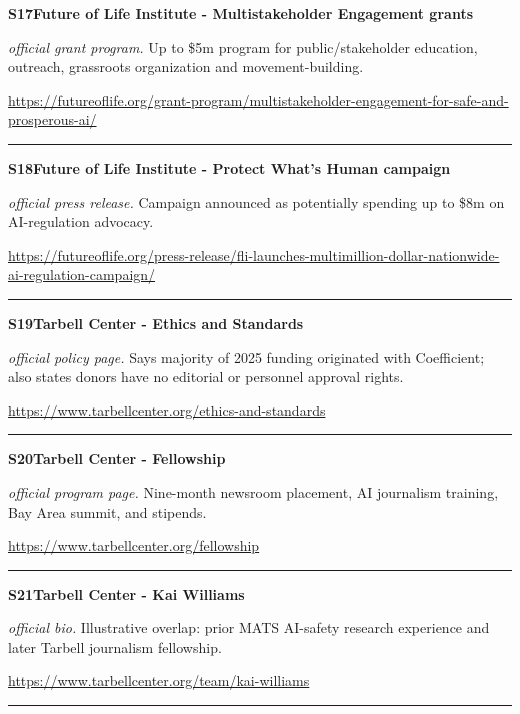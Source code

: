 \hypertarget{src:S17}{}\noindent\textbf{S17}\quad \textbf{Future of Life Institute - Multistakeholder Engagement grants}\hfill{}\par
\smallskip
\noindent\textit{official grant program.} Up to \$5m program for public/stakeholder education, outreach, grassroots organization and movement-building.\par
\noindent\url{https://futureoflife.org/grant-program/multistakeholder-engagement-for-safe-and-prosperous-ai/}\par
\medskip\hrule\medskip

\hypertarget{src:S18}{}\noindent\textbf{S18}\quad \textbf{Future of Life Institute - Protect What's Human campaign}\hfill{}\par
\smallskip
\noindent\textit{official press release.} Campaign announced as potentially spending up to \$8m on AI-regulation advocacy.\par
\noindent\url{https://futureoflife.org/press-release/fli-launches-multimillion-dollar-nationwide-ai-regulation-campaign/}\par
\medskip\hrule\medskip

\hypertarget{src:S19}{}\noindent\textbf{S19}\quad \textbf{Tarbell Center - Ethics and Standards}\hfill{}\par
\smallskip
\noindent\textit{official policy page.} Says majority of 2025 funding originated with Coefficient; also states donors have no editorial or personnel approval rights.\par
\noindent\url{https://www.tarbellcenter.org/ethics-and-standards}\par
\medskip\hrule\medskip

\hypertarget{src:S20}{}\noindent\textbf{S20}\quad \textbf{Tarbell Center - Fellowship}\hfill{}\par
\smallskip
\noindent\textit{official program page.} Nine-month newsroom placement, AI journalism training, Bay Area summit, and stipends.\par
\noindent\url{https://www.tarbellcenter.org/fellowship}\par
\medskip\hrule\medskip

\hypertarget{src:S21}{}\noindent\textbf{S21}\quad \textbf{Tarbell Center - Kai Williams}\hfill{}\par
\smallskip
\noindent\textit{official bio.} Illustrative overlap: prior MATS AI-safety research experience and later Tarbell journalism fellowship.\par
\noindent\url{https://www.tarbellcenter.org/team/kai-williams}\par
\medskip\hrule\medskip

